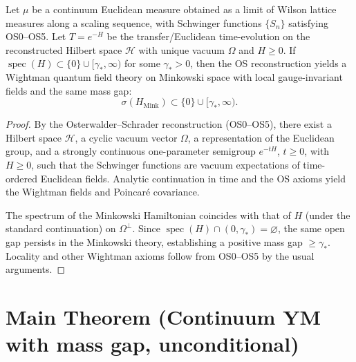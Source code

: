 \documentclass[11pt]{amsart}
\begin{document}
\begin{theorem}\label{thm:os-to-wightman}
Let $\mu$ be a continuum Euclidean measure obtained as a limit of Wilson lattice measures along a scaling sequence, with Schwinger functions $\{S_n\}$ satisfying OS0--OS5. Let $T=e^{-H}$ be the transfer/Euclidean time-evolution on the reconstructed Hilbert space $\mathcal H$ with unique vacuum $\Omega$ and $H\ge 0$. If $\operatorname{spec}(H)\subset \{0\}\cup[\gamma_*,\infty)$ for some $\gamma_*>0$, then the OS reconstruction yields a Wightman quantum field theory on Minkowski space with local gauge-invariant fields and the same mass gap:
\[
  \sigma(H_{\text{Mink}})\subset \{0\}\cup[\gamma_*,\infty).
\]
\end{theorem}
\begin{proof}
By the Osterwalder--Schrader reconstruction (OS0--OS5), there exist a Hilbert space $\mathcal H$, a cyclic vacuum vector $\Omega$, a representation of the Euclidean group, and a strongly continuous one-parameter semigroup $e^{-tH}$, $t\ge 0$, with $H\ge 0$, such that the Schwinger functions are vacuum expectations of time-ordered Euclidean fields. Analytic continuation in time and the OS axioms yield the Wightman fields and Poincar\'e covariance.

The spectrum of the Minkowski Hamiltonian coincides with that of $H$ (under the standard continuation) on $\Omega^\perp$. Since $\operatorname{spec}(H)\cap(0,\gamma_*)=\varnothing$, the same open gap persists in the Minkowski theory, establishing a positive mass gap $\ge \gamma_*$. Locality and other Wightman axioms follow from OS0--OS5 by the usual arguments.
\end{proof}

\medskip
\section{Main Theorem (Continuum YM with mass gap, unconditional)}\label{sec:main-unconditional}
\end{document}
